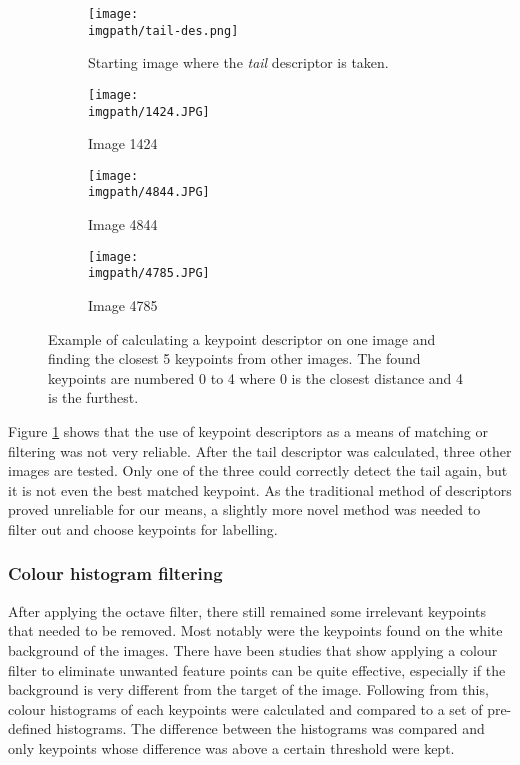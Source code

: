 \begin{figure}[H]
\centering
	\begin{subfigure}{0.45\textwidth}
	\texttt{[image: \\imgpath/tail-des.png]}
	\caption{Starting image where the \textit{tail} descriptor is taken.}
	\end{subfigure}
\hspace*{\fill}
	\begin{subfigure}{0.45\textwidth}
	\texttt{[image: \\imgpath/1424.JPG]}
	\caption{Image 1424}
	\end{subfigure}

\vspace{0.5cm}

	\begin{subfigure}{0.45\textwidth}
	\texttt{[image: \\imgpath/4844.JPG]}
	\caption{Image 4844}
	\end{subfigure}
\hspace*{\fill}
	\begin{subfigure}{0.45\textwidth}
	\texttt{[image: \\imgpath/4785.JPG]}
	\caption{Image 4785}
	\end{subfigure}

\caption{Example of calculating a keypoint descriptor on one image and finding the closest 5 keypoints from other images. The found keypoints are numbered 0 to 4 where 0 is the closest distance and 4 is the furthest.}
\label{fig:kpdescriptor}
\end{figure}
\noindent
Figure \ref{fig:kpdescriptor} shows that the use of keypoint descriptors as a means of matching or filtering was not very reliable. After the tail descriptor was calculated, three other images are tested. Only one of the three could correctly detect the tail again, but it is not even the best matched keypoint. As the traditional method of descriptors proved unreliable for our means, a slightly more novel method was needed to filter out and choose keypoints for labelling.



\subsubsection{Colour histogram filtering}\label{sec:colour-histogram}
After applying the octave filter, there still remained some irrelevant keypoints that needed to be removed. Most notably were the keypoints found on the white background of the images. There have been studies \cite{color-histogram, color-filter} that show applying a colour filter to eliminate unwanted feature points can be quite effective, especially if the background is very different from the target of the image. Following from this, colour histograms of each keypoints were calculated and compared to a set of pre-defined histograms. The difference between the histograms was compared and only keypoints whose difference was above a certain threshold were kept. 

